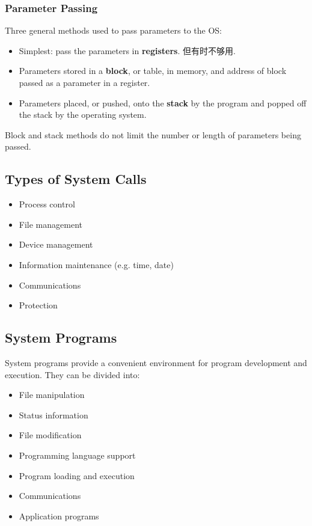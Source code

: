 \subsubsection{Parameter Passing}
Three general methods used to pass parameters to the OS: 
\begin{itemize}
    \item Simplest: pass the parameters in \textbf{registers}. 但有时不够用. 
    \item Parameters stored in a \textbf{block}, or table, in memory, and address of block passed as a parameter in a register. 
    \item Parameters placed, or pushed, onto the \textbf{stack} by the program and popped off the stack by the operating system. 
\end{itemize}
Block and stack methods do not limit the number or length of parameters being passed. 


\subsection{Types of System Calls}

\begin{itemize}
    \item Process control
    \item File management
    \item Device management
    \item Information maintenance (e.g. time, date)
    \item Communications
    \item Protection    
\end{itemize}


\subsection{System Programs}
System programs provide a convenient environment for program development and execution. They can be divided into:
\begin{itemize}
    \item File manipulation
    \item Status information
    \item File modification
    \item Programming language support
    \item Program loading and execution
    \item Communications
    \item Application programs
\end{itemize}


